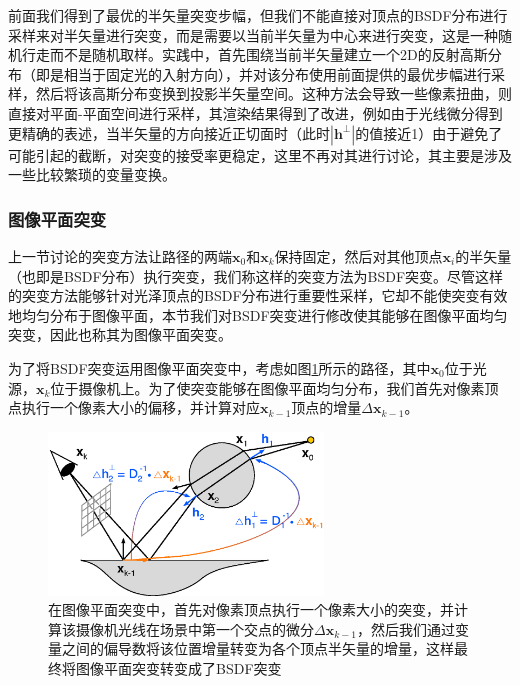前面我们得到了最优的半矢量突变步幅，但我们不能直接对顶点的BSDF分布进行采样来对半矢量进行突变，而是需要以当前半矢量为中心来进行突变，这是一种随机行走而不是随机取样。实践中，\cite{a:TheNaturalConstraintRepresentationofthePathSpaceforEfficientLightTransportSimulation}首先围绕当前半矢量建立一个2D的反射高斯分布（即是相当于固定光的入射方向），并对该分布使用前面提供的最优步幅进行采样，然后将该高斯分布变换到投影半矢量空间。这种方法会导致一些像素扭曲，\cite{a:ImprovedHalfVectorSpaceLightTransport}则直接对平面-平面空间进行采样，其渲染结果得到了改进，例如由于光线微分得到更精确的表述，当半矢量的方向接近正切面时（此时$|\mathbf{h}^{\perp}|$的值接近1）由于避免了可能引起的截断，对突变的接受率更稳定，这里不再对其进行讨论，其主要是涉及一些比较繁琐的变量变换。




\subsubsection{图像平面突变}
上一节讨论的突变方法让路径的两端$\mathbf{x}_0$和$\mathbf{x}_k$保持固定，然后对其他顶点$\mathbf{x}_i$的半矢量（也即是BSDF分布）执行突变，我们称这样的突变方法为BSDF突变。尽管这样的突变方法能够针对光泽顶点的BSDF分布进行重要性采样，它却不能使突变有效地均匀分布于图像平面，本节我们对BSDF突变进行修改使其能够在图像平面均匀突变，因此也称其为图像平面突变。

为了将BSDF突变运用图像平面突变中，考虑如图\ref{f:mlt-image-plane-perturbation}所示的路径，其中$\mathbf{x}_0$位于光源，$\mathbf{x}_k$位于摄像机上。为了使突变能够在图像平面均匀分布，我们首先对像素顶点执行一个像素大小的偏移，并计算对应$\mathbf{x}_{k-1}$顶点的增量$\Delta\mathbf{x}_{k-1}$。

\begin{figure}
	\sidecaption
	\includegraphics[width=0.65\textwidth]{figures/mlt/hslt-perturbation}
	\caption{在图像平面突变中，首先对像素顶点执行一个像素大小的突变，并计算该摄像机光线在场景中第一个交点的微分$\Delta\mathbf{x}_{k-1}$，然后我们通过变量之间的偏导数将该位置增量转变为各个顶点半矢量的增量，这样最终将图像平面突变转变成了BSDF突变}
	\label{f:mlt-image-plane-perturbation}
\end{figure}

